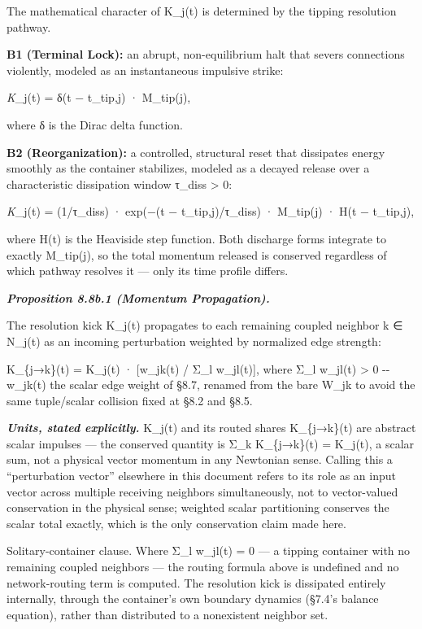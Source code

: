 \documentclass[
]{article}
\begin{document}
The mathematical character of K\_j(t) is determined by the tipping
resolution pathway.

\textbf{B1 (Terminal Lock):} an abrupt, non-equilibrium halt that severs
connections violently, modeled as an instantaneous impulsive strike:

\emph{K}\_j(t) = δ(t − t\_tip,j) · M\_tip(j),

where δ is the Dirac delta function.

\textbf{B2 (Reorganization):} a controlled, structural reset that
dissipates energy smoothly as the container stabilizes, modeled as a
decayed release over a characteristic dissipation window τ\_diss
\textgreater{} 0:

\emph{K}\_j(t) = (1/τ\_diss) · exp(−(t − t\_tip,j)/τ\_diss) · M\_tip(j)
· H(t − t\_tip,j),

where H(t) is the Heaviside step function. Both discharge forms
integrate to exactly M\_tip(j), so the total momentum released is
conserved regardless of which pathway resolves it --- only its time
profile differs.

\emph{\textbf{Proposition 8.8b.1 (Momentum Propagation).}}

The resolution kick K\_j(t) propagates to each remaining coupled
neighbor k ∈ N\_j(t) as an incoming perturbation weighted by normalized
edge strength:

K\_\{j→k\}(t) = K\_j(t) · {[}w\_jk(t) / Σ\_l w\_jl(t){]}, where Σ\_l
w\_jl(t) \textgreater{} 0 -\/- w\_jk(t) the scalar edge weight of §8.7,
renamed from the bare W\_jk to avoid the same tuple/scalar collision
fixed at §8.2 and §8.5.

\emph{\textbf{Units, stated explicitly.}} K\_j(t) and its routed shares
K\_\{j→k\}(t) are abstract scalar impulses --- the conserved quantity is
Σ\_k K\_\{j→k\}(t) = K\_j(t), a scalar sum, not a physical vector
momentum in any Newtonian sense. Calling this a ``perturbation vector''
elsewhere in this document refers to its role as an input vector across
multiple receiving neighbors simultaneously, not to vector-valued
conservation in the physical sense; weighted scalar partitioning
conserves the scalar total exactly, which is the only conservation claim
made here.

Solitary-container clause. Where Σ\_l w\_jl(t) = 0 --- a tipping
container with no remaining coupled neighbors --- the routing formula
above is undefined and no network-routing term is computed. The
resolution kick is dissipated entirely internally, through the
container's own boundary dynamics (§7.4's balance equation), rather than
distributed to a nonexistent neighbor set.
\end{document}
